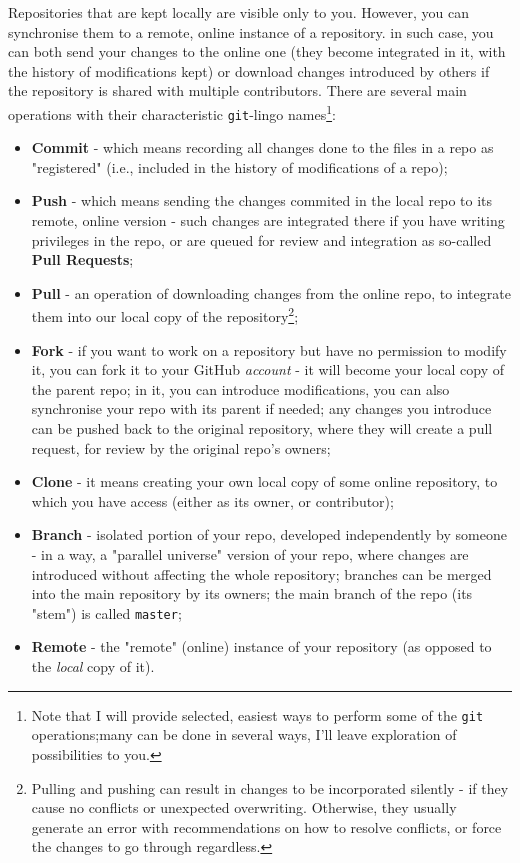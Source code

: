 \documentclass{tufte-handout}
\begin{document}
Repositories that are kept locally are visible only to you. However, you can synchronise them to a remote, online instance of a repository. in such case, you can both send your changes to the online one (they become integrated in it, with the history of modifications kept) or download changes introduced by others if the repository is shared with multiple contributors. There are several main operations with their characteristic \texttt{git}-lingo names\footnote{Note that I will provide selected, easiest ways to perform some of the \texttt{git} operations;many can be done in several ways, I'll leave exploration of possibilities to you.}:
\begin{itemize}
    \item \textbf{Commit} - which means recording all changes done to the files in a repo as "registered" (i.e., included in the history of modifications of a repo);
    \item \textbf{Push} - which means sending the changes commited in the local repo to its remote, online version - such changes are integrated there if you have writing privileges in the repo, or are queued for review and integration as so-called \textbf{Pull Requests};
    \item \textbf{Pull} - an operation of downloading changes from the online repo, to integrate them into our local copy of the repository\footnote{Pulling and pushing can result in changes to be incorporated silently - if they cause no conflicts or unexpected overwriting. Otherwise, they usually generate an error with recommendations on how to resolve conflicts, or force the changes to go through regardless.};
    \item \textbf{Fork} - if you want to work on a repository but have no permission to modify it, you can fork it to your GitHub \textit{account} - it will become your local copy of the parent repo; in it, you can introduce modifications, you can also synchronise your repo with its parent if needed; any changes you introduce can be pushed back to the original repository, where they will create a pull request, for review by the original repo's owners;
    \item \textbf{Clone} - it means creating your own local copy of some online repository, to which you have access (either as its owner, or contributor);
    \item \textbf{Branch} - isolated portion of your repo, developed independently by someone - in a way, a "parallel universe" version of your repo, where changes are introduced without affecting the whole repository; branches can be merged into the main repository by its owners; the main branch of the repo (its "stem") is called \texttt{master};
    \item \textbf{Remote} - the "remote" (online) instance of your repository (as opposed to the \textit{local} copy of it).
\end{itemize}
\end{document}
